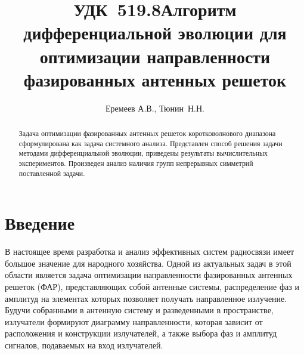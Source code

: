\documentclass{llncs}
\begin{document}
\mainmatter              %
%
\title{\hbox{\normalsize УДК 519.8}Алгоритм дифференциальной эволюции для оптимизации направленности фазированных антенных решеток}
%
\titlerunning{ }  %
%
\author{Еремеев А.В., Тюнин~Н.Н.}
%
%
%

\maketitle              %

\begin{abstract}
Задача оптимизации фазированных антенных решеток коротковолнового диапазона сформулирована как задача системного анализа. Представлен способ решения задачи методами дифференциальной эволюции, приведены результаты вычислительных экспериментов. Произведен анализ наличия групп непрерывных симметрий поставленной задачи.


\end{abstract}

\thispagestyle{empty}
\section*{Введение}
В настоящее время разработка и анализ эффективных систем радиосвязи имеет большое значение для народного хозяйства. Одной из актуальных задач в этой области является задача оптимизации направленности фазированных антенных решеток (ФАР), представляющих собой антенные системы, распределение фаз и амплитуд на элементах которых позволяет получать направленное излучение.
Будучи собранными в антенную систему и разведенными в пространстве, излучатели формируют диаграмму направленности, которая зависит от расположения и конструкции излучателей, а также выбора фаз и амплитуд сигналов, подаваемых на вход излучателей.
\end{document}
